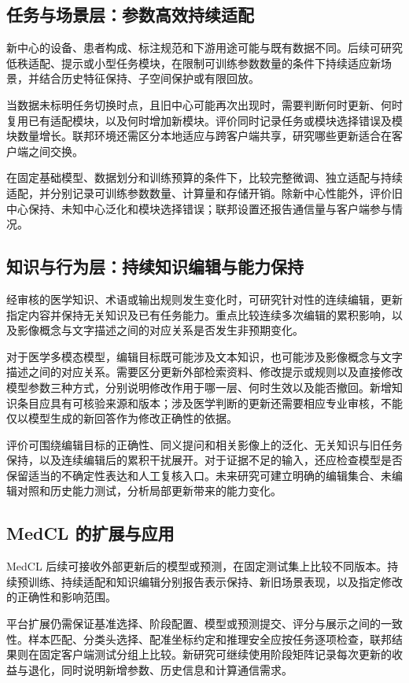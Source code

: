 \subsection{任务与场景层：参数高效持续适配}

新中心的设备、患者构成、标注规范和下游用途可能与既有数据不同。后续可研究低秩适配、提示或小型任务模块，在限制可训练参数数量的条件下持续适应新场景，并结合历史特征保持、子空间保护或有限回放。

当数据未标明任务切换时点，且旧中心可能再次出现时，需要判断何时更新、何时复用已有适配模块，以及何时增加新模块。评价同时记录任务或模块选择错误及模块数量增长。联邦环境还需区分本地适应与跨客户端共享，研究哪些更新适合在客户端之间交换。

在固定基础模型、数据划分和训练预算的条件下，比较完整微调、独立适配与持续适配，并分别记录可训练参数数量、计算量和存储开销。除新中心性能外，评价旧中心保持、未知中心泛化和模块选择错误；联邦设置还报告通信量与客户端参与情况。

\subsection{知识与行为层：持续知识编辑与能力保持}

经审核的医学知识、术语或输出规则发生变化时，可研究针对性的连续编辑，更新指定内容并保持无关知识及已有任务能力。重点比较连续多次编辑的累积影响，以及影像概念与文字描述之间的对应关系是否发生非预期变化。

对于医学多模态模型，编辑目标既可能涉及文本知识，也可能涉及影像概念与文字描述之间的对应关系。需要区分更新外部检索资料、修改提示或规则以及直接修改模型参数三种方式，分别说明修改作用于哪一层、何时生效以及能否撤回。新增知识条目应具有可核验来源和版本；涉及医学判断的更新还需要相应专业审核，不能仅以模型生成的新回答作为修改正确性的依据。

评价可围绕编辑目标的正确性、同义提问和相关影像上的泛化、无关知识与旧任务保持，以及连续编辑后的累积干扰展开。对于证据不足的输入，还应检查模型是否保留适当的不确定性表达和人工复核入口。未来研究可建立明确的编辑集合、未编辑对照和历史能力测试，分析局部更新带来的能力变化。

\subsection{MedCL 的扩展与应用}

MedCL 后续可接收外部更新后的模型或预测，在固定测试集上比较不同版本。持续预训练、持续适配和知识编辑分别报告表示保持、新旧场景表现，以及指定修改的正确性和影响范围。

平台扩展仍需保证基准选择、阶段配置、模型或预测提交、评分与展示之间的一致性。样本匹配、分类头选择、配准坐标约定和推理安全应按任务逐项检查，联邦结果则在固定客户端测试分组上比较。新研究可继续使用阶段矩阵记录每次更新的收益与退化，同时说明新增参数、历史信息和计算通信需求。